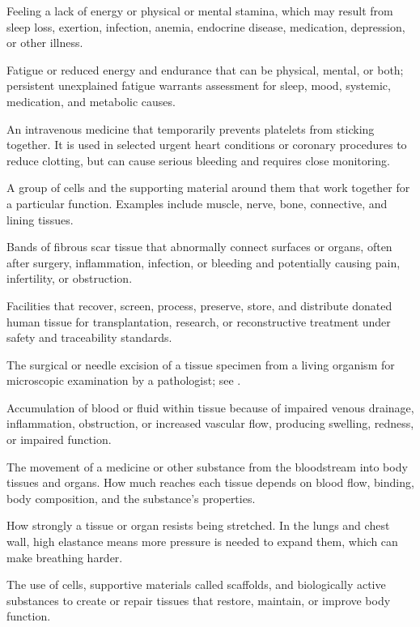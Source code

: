  Feeling a lack of energy or physical or mental stamina, which may result from sleep loss, exertion, infection, anemia, endocrine disease, medication, depression, or other illness.

 Fatigue or reduced energy and endurance that can be physical, mental, or both; persistent unexplained fatigue warrants assessment for sleep, mood, systemic, medication, and metabolic causes.

 An intravenous medicine that temporarily prevents platelets from sticking together. It is used in selected urgent heart conditions or coronary procedures to reduce clotting, but can cause serious bleeding and requires close monitoring.

 A group of cells and the supporting material around them that work together for a particular function. Examples include muscle, nerve, bone, connective, and lining tissues.

 Bands of fibrous scar tissue that abnormally connect surfaces or organs, often after surgery, inflammation, infection, or bleeding and potentially causing pain, infertility, or obstruction.

 Facilities that recover, screen, process, preserve, store, and distribute donated human tissue for transplantation, research, or reconstructive treatment under safety and traceability standards.

 The surgical or needle excision of a tissue specimen from a living organism for microscopic examination by a pathologist; see .

 Accumulation of blood or fluid within tissue because of impaired venous drainage, inflammation, obstruction, or increased vascular flow, producing swelling, redness, or impaired function.

 The movement of a medicine or other substance from the bloodstream into body tissues and organs. How much reaches each tissue depends on blood flow, binding, body composition, and the substance’s properties.

 How strongly a tissue or organ resists being stretched. In the lungs and chest wall, high elastance means more pressure is needed to expand them, which can make breathing harder.

 The use of cells, supportive materials called scaffolds, and biologically active substances to create or repair tissues that restore, maintain, or improve body function.

